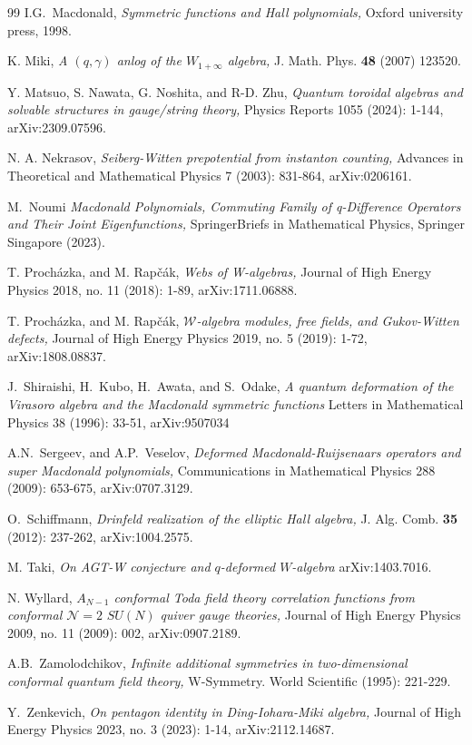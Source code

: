 \documentclass[12pt,reqno,a4paper]{amsart}
\newcommand{\cals}[1]{\mathcal{#1}}
\numberwithin{equation}{section}
\theoremstyle{definition}
\begin{document}
\begin{thebibliography}{99}
I.G.~Macdonald,
{\it Symmetric functions and Hall polynomials,}
Oxford university press, 1998.

K. Miki, 
{\it A $(q, \gamma)$ anlog of the $W_{1+\infty}$ algebra,}
J. Math. Phys. {\bf 48} (2007) 123520.

Y. Matsuo, S. Nawata, G. Noshita, and R-D. Zhu, 
{\it Quantum toroidal algebras and solvable structures in gauge/string theory,}
Physics Reports 1055 (2024): 1-144,
arXiv:2309.07596. 

N. A. Nekrasov,
{\it Seiberg-Witten prepotential from instanton counting,}
Advances in Theoretical and Mathematical Physics 7 (2003): 831-864,
arXiv:0206161. 

M.~Noumi
{\it Macdonald Polynomials, Commuting Family of q-Difference Operators and Their Joint Eigenfunctions,}
SpringerBriefs in Mathematical Physics, Springer Singapore (2023).

T. Procházka, and M. Rapčák,
{\it Webs of W-algebras,}
Journal of High Energy Physics 2018, no. 11 (2018): 1-89,
arXiv:1711.06888. 

T. Procházka, and M. Rapčák,
{\it $\cals{W}$-algebra modules, free fields, and Gukov-Witten defects,}
Journal of High Energy Physics 2019, no. 5 (2019): 1-72,
arXiv:1808.08837. 
		
J.~Shiraishi, H.~Kubo, H.~Awata, and S.~Odake,
{\it A quantum deformation of the Virasoro algebra and the Macdonald symmetric functions}
Letters in Mathematical Physics 38 (1996): 33-51,
arXiv:9507034

A.N.~Sergeev, and A.P.~Veselov, 
{\it Deformed Macdonald-Ruijsenaars operators and super Macdonald polynomials,}
Communications in Mathematical Physics 288 (2009): 653-675, 
arXiv:0707.3129. 

O.~Schiffmann,
{\it Drinfeld realization of the elliptic Hall algebra,}
J. Alg.  Comb.  \textbf{35}  (2012): 237-262, 
arXiv:1004.2575.

M. Taki, 
{\it On AGT-W conjecture and $q$-deformed $W$-algebra}
arXiv:1403.7016.

N. Wyllard,
{\it $A_{N-1}$ conformal Toda field theory correlation functions from conformal $\cals{N = 2} \,\, SU(N)$ quiver gauge theories,}
Journal of High Energy Physics 2009, no. 11 (2009): 002,
arXiv:0907.2189.  

A.B.~Zamolodchikov,
{\it Infinite additional symmetries in two-dimensional conformal quantum field theory,}
W-Symmetry. World Scientific (1995): 221-229.		


Y.~Zenkevich,
{\it On pentagon identity in Ding-Iohara-Miki algebra,}
Journal of High Energy Physics 2023, no. 3 (2023): 1-14, 
arXiv:2112.14687.















		
		
		
	\end{thebibliography}
	
	
\end{document}
